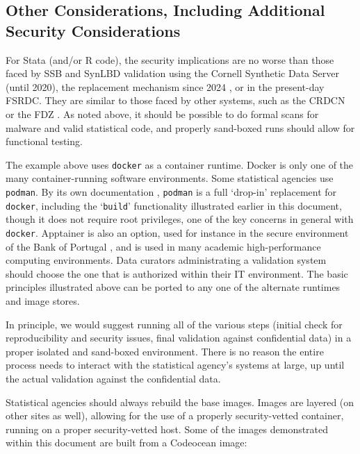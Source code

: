 \documentclass[inline]{hdsr}
\begin{document}
\subsection{Other Considerations, Including Additional Security Considerations}

For Stata (and/or R code), the security implications are no worse than those  faced by \ac{SSB} and SynLBD validation using the Cornell Synthetic Data Server (until 2020), the replacement  mechanism since 2024 \citep{u.s.censusbureauSIPPSyntheticBeta2015b,us_census_bureau_validating_2023}, or in the present-day \ac{FSRDC}. They are similar to those faced by other systems, such as the \ac{CRDCN} or the \ac{FDZ} \citep{bender_research-data-centre_2011,muller_institute_2021}. As noted above, it should be possible to do formal scans for malware and valid statistical code, and properly sand-boxed runs should allow for functional testing.

The example above uses \texttt{docker} as a container runtime. Docker is only one of the many container-running software environments. Some statistical agencies use \texttt{podman}. By its own documentation \citep{noauthor_podman_nodate}, \texttt{podman} is a full `drop-in' replacement for  \texttt{docker}, including the `\texttt{build}' functionality illustrated earlier in this document, though it does not require root privileges, one of the key concerns in general with \texttt{docker}. Apptainer \citep{contributors_to_the_apptainer_project_apptainer_2025} is also an option, used for instance in the secure environment of the Bank of Portugal \citep{guimaraes_reproducibility_2023}, and is used in many academic high-performance computing environments. Data curators administrating a validation system should choose the one that is authorized within their IT environment. The basic principles illustrated above can be ported to any one of the alternate runtimes and image stores.

In principle, we would suggest running all of the various steps (initial check for reproducibility and security issues, final validation against confidential data) in a proper isolated and sand-boxed environment. There is no reason the entire process needs to interact with the statistical agency's systems at large, up until the actual validation against the confidential data.

Statistical agencies should always rebuild the base images. Images are layered (on other sites as well), allowing for the use of a properly security-vetted container, running on a proper security-vetted host. Some of the images demonstrated within this document are built from a Codeocean image:
\end{document}
